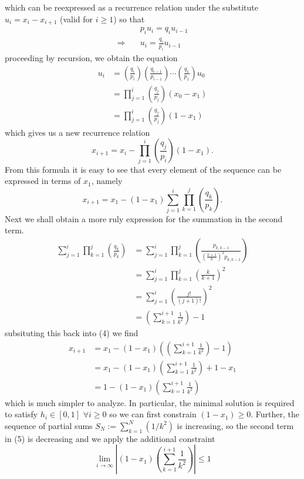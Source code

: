 \documentclass[11pt, letterpaper]{article}
\begin{document}
which can be reexpressed as a recurrence relation under the substitute $u_i=x_i-x_{i+1}$ (valid for $i\geq 1$) so that
\begin{align*}
    &p_iu_i=q_iu_{i-1}\\
    \Rightarrow\quad&u_i=\frac{q_i}{p_i}u_{i-1}
\end{align*}
proceeding by recursion, we obtain the equation
\begin{align*}
    u_i&=\left(\frac{q_i}{p_i}\right)\left(\frac{q_{i-1}}{p_{i-1}}\right)\cdots\left(\frac{q_1}{p_1}\right)u_0\\
    &=\prod_{j=1}^i\left(\frac{q_j}{p_j}\right)(x_0-x_1)\\
    &=\prod_{j=1}^i\left(\frac{q_j}{p_j}\right)(1-x_1)
\end{align*}
which gives us a new recurrence relation
\[x_{i+1}=x_i-\prod_{j=1}^i\left(\frac{q_j}{p_i}\right)(1-x_1).\]
From this formula it is easy to see that every element of the sequence can be expressed in terms of $x_1$, namely
\[x_{i+1}=x_1-(1-x_1)\sum_{j=1}^i\prod_{k=1}^j\left(\frac{q_k}{p_k}\right).\tag{4}\]
Next we shall obtain a more ruly expression for the summation in the second term.
\begin{align*}
    \sum_{j=1}^i\prod_{k=1}^j\left(\frac{q_k}{p_k}\right)&=\sum_{j=1}^i\prod_{k=1}^j\left(\frac{p_{k,k-1}}{\left(\frac{k+1}{k}\right)^2p_{k,k-1}}\right)\\
    &=\sum_{j=1}^i\prod_{k=1}^j\left(\frac{k}{k+1}\right)^2\\
    &=\sum_{j=1}^i\left(\frac{j!}{(j+1)!}\right)^2\\
    &=\left(\sum_{k=1}^{i+1}\frac{1}{k^2}\right)-1\tag{simplify factorials and reindex}
\end{align*}
subsituting this back into (4) we find
\begin{align*}
    x_{i+1}&=x_1-(1-x_1)\left(\left(\sum_{k=1}^{i+1}\frac{1}{k^2}\right)-1\right)\\
    &=x_1-(1-x_1)\left(\sum_{k=1}^{i+1}\frac{1}{k^2}\right)+1-x_1\\
    &=1-(1-x_1)\left(\sum_{k=1}^{i+1}\frac{1}{k^2}\right)\tag{5}
\end{align*}
which is much simpler to analyze. In particular, the minimal solution is required to satisfy $h_i\in[0,1]$ $\forall i\geq 0$
so we can first constrain $(1-x_1)\geq 0$. Further, the sequence of partial sums $S_N:=\sum_{k=1}^N(1/k^2)$ is increasing, so the second term in (5) is decreasing
and we apply the additional constraint
\[\lim_{i\rightarrow\infty}\left|(1-x_1)\left(\sum_{k=1}^{i+1}\frac{1}{k^2}\right)\right|\leq 1\]
\end{document}
